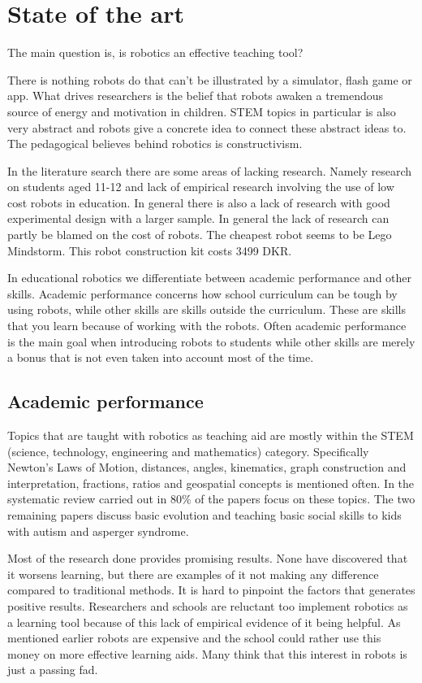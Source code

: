 \section*{State of the art}
The main question is, is robotics an effective teaching tool?

There is nothing robots do that can't be illustrated by a simulator, flash game or app. What drives researchers is the belief that robots awaken a tremendous source of energy and motivation in children. STEM topics in particular is also very abstract and robots give a concrete idea to connect these abstract ideas to. The pedagogical believes behind robotics is constructivism. 

In the literature search there are some areas of lacking research. Namely research on students aged 11-12 and lack of empirical research involving the use of low cost robots in education. In general there is also a lack of research with good experimental design with a larger sample. In general the lack of research can partly be blamed on the cost of robots. The cheapest robot seems to be Lego Mindstorm. This robot construction kit costs 3499 DKR. 

In educational robotics we differentiate between academic performance and other skills. Academic performance concerns how school curriculum can be tough by using robots, while other skills are skills outside the curriculum. These are skills that you learn because of working with the robots. Often academic performance is the main goal when introducing robots to students while other skills are merely a bonus that is not even taken into account most of the time. 

\subsection{Academic performance}

Topics that are taught with robotics as teaching aid are mostly within the STEM (science, technology, engineering and mathematics) category. Specifically Newton's Laws of Motion, distances, angles, kinematics, graph construction and interpretation, fractions, ratios and geospatial concepts is mentioned often. In the systematic review carried out in \cite{Benitti2012978} 80\% of the papers focus on these topics. The two remaining papers discuss basic evolution and teaching basic social skills to kids with autism and asperger syndrome. 

Most of the research done provides promising results. None have discovered that it worsens learning, but there are examples of it not making any difference compared to traditional methods. It is hard to pinpoint the factors that generates positive results. Researchers and schools are reluctant too implement robotics as a learning tool because of this lack of empirical evidence of it being helpful. As mentioned earlier robots are expensive and the school could rather use this money on more effective learning aids. Many think that this interest in robots is just a passing fad. 

